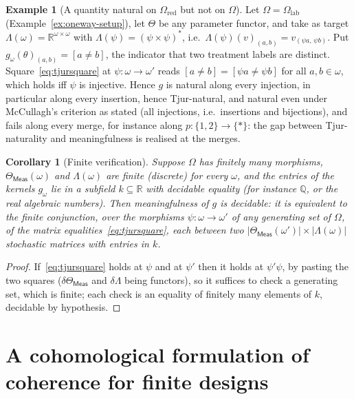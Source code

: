 \documentclass[11pt,a4paper]{article}
\theoremstyle{plain}
\newtheorem{corollary}[theorem]{Corollary}
\theoremstyle{definition}
\newtheorem{example}[theorem]{Example}
\theoremstyle{remark}
\newcommand{\cat}[1]{\mathsf{#1}}
\newcommand{\catO}{\cat{\Omega}}
\newcommand{\Meas}{\cat{Meas}}
\newcommand{\del}{\delta}
\newcommand{\R}{\mathbb{R}}
\begin{document}
\begin{example}[A quantity natural on $\catO_{\mathrm{red}}$ but not on
$\catO$]\label{ex:tjurgap}
Let $\catO = \catO_{\mathrm{lab}}$ (Example~\ref{ex:oneway-setup}), let
$\Theta$ be any parameter functor, and take as target
$\Lambda(\omega) = \R^{\omega \times \omega}$ with
$\Lambda(\psi) = (\psi\times\psi)^{*}$, i.e.\
$\Lambda(\psi)(v)_{(a,b)} = v_{(\psi a,\,\psi b)}$. Put
$g_\omega(\theta)_{(a,b)} = [a \neq b]$, the indicator that two treatment
labels are distinct. Square~\eqref{eq:tjursquare} at
$\psi \colon \omega \to \omega'$ reads $[a \neq b] = [\psi a \neq \psi b]$
for all $a,b \in \omega$, which holds iff $\psi$ is injective. Hence $g$ is
natural along every injection, in particular along every insertion, hence
Tjur-natural, and natural even under McCullagh's criterion as stated (all
injections, i.e.\ insertions and bijections), and fails along every merge, for instance
along $p \colon \{1,2\} \to \{*\}$: the gap between Tjur-naturality and
meaningfulness is realised at the merges.
\end{example}

\begin{corollary}[Finite verification]\label{cor:decidable}
Suppose $\catO$ has finitely many morphisms, $\Theta_\Meas(\omega)$ and
$\Lambda(\omega)$ are finite (discrete) for every $\omega$, and the entries of
the kernels $g_\omega$ lie in a subfield $k \subseteq \R$ with decidable
equality (for instance $\mathbb{Q}$, or the real algebraic numbers). Then
meaningfulness of $g$ is decidable: it is equivalent to the finite
conjunction, over the morphisms $\psi \colon \omega \to \omega'$ of any
generating set of $\catO$, of the matrix equalities~\eqref{eq:tjursquare},
each between two $|\Theta_\Meas(\omega')| \times |\Lambda(\omega)|$ stochastic
matrices with entries in $k$.
\end{corollary}

\begin{proof}
If~\eqref{eq:tjursquare} holds at $\psi$ and at $\psi'$ then it holds at
$\psi'\psi$, by pasting the two squares ($\del\Theta_\Meas$ and $\del\Lambda$
being functors), so it suffices to check a generating set, which is finite;
each check is an equality of finitely many elements of $k$, decidable by
hypothesis.
\end{proof}

\section{A cohomological formulation of coherence for finite
designs}\label{sec:hochschild}
\end{document}
